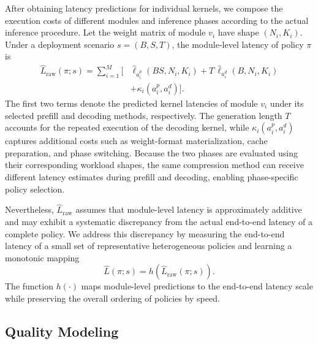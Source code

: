 \documentclass[letterpaper]{article} %
\begin{document}
After obtaining latency predictions for individual kernels, we compose the execution costs of different modules and inference phases according to the actual inference procedure. Let the weight matrix of module $v_i$ have shape $(N_i,K_i)$. Under a deployment scenario $s=(B,S,T)$, the module-level latency of policy $\pi$ is
\begin{equation}
\begin{aligned}
\widehat{L}_{\mathrm{raw}}(\pi;s)
= \sum_{i=1}^{M}
\bigl[
& \widehat{\ell}_{a_i^{p}}(BS,N_i,K_i)
+ T\,\widehat{\ell}_{a_i^{d}}(B,N_i,K_i) \\
& + \kappa_i(a_i^{p},a_i^{d})
\bigr].
\end{aligned}
\end{equation}
The first two terms denote the predicted kernel latencies of module $v_i$ under its selected prefill and decoding methods, respectively. The generation length $T$ accounts for the repeated execution of the decoding kernel, while $\kappa_i(a_i^{p},a_i^{d})$ captures additional costs such as weight-format materialization, cache preparation, and phase switching. Because the two phases are evaluated using their corresponding workload shapes, the same compression method can receive different latency estimates during prefill and decoding, enabling phase-specific policy selection.

Nevertheless, $\widehat{L}_{\mathrm{raw}}$ assumes that module-level latency is approximately additive and may exhibit a systematic discrepancy from the actual end-to-end latency of a complete policy. We address this discrepancy by measuring the end-to-end latency of a small set of representative heterogeneous policies and learning a monotonic mapping
\begin{equation}
\widehat{L}(\pi;s)
=
h\!\left(
\widehat{L}_{\mathrm{raw}}(\pi;s)
\right).
\end{equation}
The function $h(\cdot)$ maps module-level predictions to the end-to-end latency scale while preserving the overall ordering of policies by speed.

\subsection{Quality Modeling}
\end{document}
